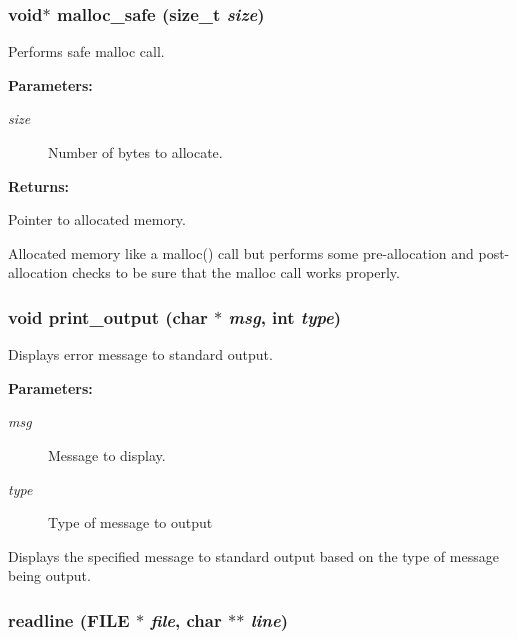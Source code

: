 \subsubsection{\setlength{\rightskip}{0pt plus 5cm}void$\ast$ malloc\_\-safe (size\_\-t {\em size})}\label{util_8h_a13}


Performs safe malloc call.

\begin{Desc}
\item[{\bf Parameters: }]\par
\begin{description}
\item[
{\em size}]Number of bytes to allocate.

\end{description}
\end{Desc}
\begin{Desc}
\item[{\bf Returns: }]\par
Pointer to allocated memory.

\end{Desc}
Allocated memory like a malloc() call but performs some pre-allocation and post-allocation checks to be sure that the malloc call works properly. 
\subsubsection{\setlength{\rightskip}{0pt plus 5cm}void print\_\-output (char $\ast$ {\em msg}, int {\em type})}\label{util_8h_a2}


Displays error message to standard output.

\begin{Desc}
\item[{\bf Parameters: }]\par
\begin{description}
\item[
{\em msg}]Message to display. \item[
{\em type}]Type of message to output

\end{description}
\end{Desc}
Displays the specified message to standard output based on the type of message being output. 
\subsubsection{ readline (FILE $\ast$ {\em file}, char $\ast$$\ast$ {\em line})}\label{util_8h_a8}


